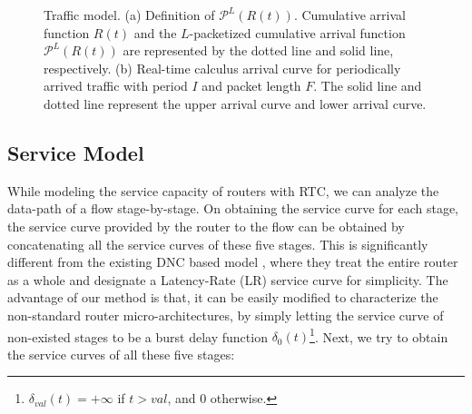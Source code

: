 \documentclass[10pt,journal]{IEEEtran}
\begin{document}
\begin{figure}
  \caption{Traffic model. (a) Definition of $\mathcal{P}^L(R(t))$. Cumulative arrival function $R(t)$ and the $L$-packetized cumulative arrival function $\mathcal{P}^L(R(t))$ are represented by the dotted line and solid line, respectively. (b) Real-time calculus arrival curve for periodically arrived traffic with period $I$ and packet length $F$. The solid line and dotted line represent the upper arrival curve and lower arrival curve.}\label{ac}
\end{figure}

\subsection{Service Model}\label{router}
While modeling the service capacity of routers with RTC, we can analyze the data-path of a flow stage-by-stage. On obtaining the service curve for each stage, the service curve provided by the router to the flow can be obtained by concatenating all the service curves of these five stages. This is significantly different from the existing DNC based model \cite{qian2009analysis,Qian489900}, where they treat the entire router as a whole and designate a Latency-Rate (LR) service curve \cite{Boudec2001Network} for simplicity. The advantage of our method is that, it can be easily modified to characterize the non-standard router micro-architectures, by simply letting the service curve of non-existed stages to be a burst delay function $\delta_0(t)$\footnote{$\delta_{val}(t)=+\infty$ if $t>val$, and 0 otherwise.}. Next, we try to obtain the service curves of all these five stages:
\end{document}
